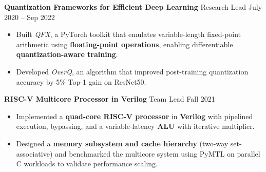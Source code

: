 \documentclass[letterpaper,10pt]{article}
\newcommand{\experienceBulletListStart}{\begin{itemize}[leftmargin=0.3in, label=$\bullet$, topsep=2pt, itemsep=0.2em, parsep=0pt]}
\newcommand{\experienceBulletListEnd}{\end{itemize}\vspace{4pt}}
\newcommand{\projectTitle}[2]{
    \textbf{#1} \hfill #2
    \vspace{-2pt}
}
\newcommand{\projectTitleWithRole}[3]{
    \textbf{#1} \hspace{0.5em} \normalsize{#2} \hfill #3
    \vspace{-2pt}
}
\begin{document}
\projectTitleWithRole{Quantization Frameworks for Efficient Deep Learning}{Research Lead}{July 2020 – Sep 2022}
\experienceBulletListStart
  \item\normalsize{Built \textit{QFX}, a PyTorch toolkit that emulates variable-length fixed-point arithmetic using \textbf{floating-point operations}, enabling differentiable \textbf{quantization-aware training}.}
  \item\normalsize{Developed \textit{OverQ}, an algorithm that improved post-training quantization accuracy by 5\% Top-1 gain on ResNet50.}
\experienceBulletListEnd




\projectTitleWithRole{RISC-V Multicore Processor in Verilog}{Team Lead}{Fall 2021}
\experienceBulletListStart
  \item\normalsize{Implemented a \textbf{quad-core RISC-V processor} in \textbf{Verilog} with pipelined execution, bypassing, and a variable-latency \textbf{ALU} with iterative multiplier.}
  \item\normalsize{Designed a \textbf{memory subsystem and cache hierarchy} (two-way set-associative) and benchmarked the multicore system using PyMTL on parallel C workloads to validate performance scaling.}
\experienceBulletListEnd
\end{document}
